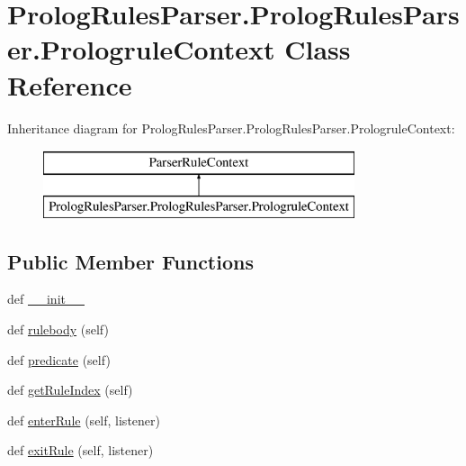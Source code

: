 \hypertarget{class_prolog_rules_parser_1_1_prolog_rules_parser_1_1_prologrule_context}{}\section{Prolog\+Rules\+Parser.\+Prolog\+Rules\+Parser.\+Prologrule\+Context Class Reference}
\label{class_prolog_rules_parser_1_1_prolog_rules_parser_1_1_prologrule_context}
Inheritance diagram for Prolog\+Rules\+Parser.\+Prolog\+Rules\+Parser.\+Prologrule\+Context\+:\begin{figure}[H]
\begin{center}
\leavevmode
\includegraphics[height=2.000000cm]{class_prolog_rules_parser_1_1_prolog_rules_parser_1_1_prologrule_context}
\end{center}
\end{figure}
\subsection*{Public Member Functions}
\begin{DoxyCompactItemize}
\item 
def \hyperlink{class_prolog_rules_parser_1_1_prolog_rules_parser_1_1_prologrule_context_ab19a9d38ed5129b9e826422b5c9d6f35}{\+\_\+\+\_\+init\+\_\+\+\_\+}
\item 
def \hyperlink{class_prolog_rules_parser_1_1_prolog_rules_parser_1_1_prologrule_context_ab10a3a8deaee8b4cd099bb408b487fd0}{rulebody} (self)
\item 
def \hyperlink{class_prolog_rules_parser_1_1_prolog_rules_parser_1_1_prologrule_context_a382f279f2235ff7882b00ca4f57e8321}{predicate} (self)
\item 
def \hyperlink{class_prolog_rules_parser_1_1_prolog_rules_parser_1_1_prologrule_context_a9b98ac8c293cf497a0d1004e11d724b6}{get\+Rule\+Index} (self)
\item 
def \hyperlink{class_prolog_rules_parser_1_1_prolog_rules_parser_1_1_prologrule_context_a08ce20c403149023fba5207048089bd0}{enter\+Rule} (self, listener)
\item 
def \hyperlink{class_prolog_rules_parser_1_1_prolog_rules_parser_1_1_prologrule_context_ab6fa5a4a6460dcb27b4d37f62355a920}{exit\+Rule} (self, listener)
\end{DoxyCompactItemize}
